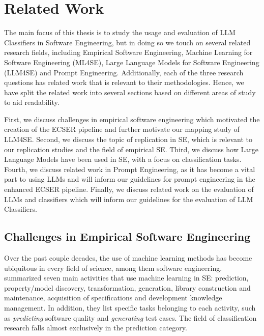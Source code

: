 \documentclass[a4paper]{article}
\begin{document}
\section{Related Work} \label{Related Work}
The main focus of this thesis is to study the usage and evaluation of LLM Classifiers in Software Engineering, but in doing so we touch on several related research fields, including Empirical Software Engineering, Machine Learning for Software Engineering (ML4SE), Large Language Models for Software Engineering (LLM4SE) and Prompt Engineering. Additionally, each of the three research questions has related work that is relevant to their methodologies. Hence, we have split the related work into several sections based on different areas of study to aid readability. 

First, we discuss challenges in empirical software engineering which motivated the creation of the ECSER pipeline and further motivate our mapping study of LLM4SE. Second, we discuss the topic of replication in SE, which is relevant to our replication studies and the field of empirical SE. Third, we discuss how Large Language Models have been used in SE, with a focus on classification tasks. Fourth, we discuss related work in Prompt Engineering, as it has become a vital part to using LLMs and will inform our guidelines for prompt engineering in the enhanced ECSER pipeline. Finally, we discuss related work on the evaluation of LLMs and classifiers which will inform our guidelines for the evaluation of LLM Classifiers.

\subsection{Challenges in Empirical Software Engineering}
Over the past couple decades, the use of machine learning methods has become ubiquitous in every field of science, among them software engineering. \textcite{Zhang2002} summarized seven main activities that use machine learning in SE: prediction, property/model discovery, transformation, generation, library construction and maintenance, acquisition of specifications and development knowledge management. In addition, they list specific tasks belonging to each activity, such as \textit{predicting} software quality and \textit{generating} test cases. The field of classification research falls almost exclusively in the prediction category.
\end{document}

